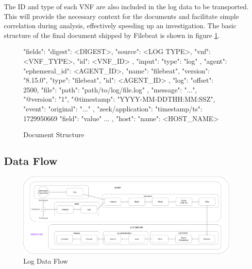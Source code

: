 \documentclass[final,1p,times,authoryear]{elsarticle}
\begin{document}
\vspace{1em}

The ID and type of each VNF are also included in the log data to be transported. This will provide the necessary context for the documents and facilitate simple correlation during analysis, effectively speeding up an investigation. The basic structure of the final document shipped by Filebeat is shown in figure \ref{fig:document-structure}.
\begin{figure}[H]
    \centering
\begin{smalljson}
{
    "fields": {
      "digest": <DIGEST>, %
      "source": <LOG TYPE>, %
      "vnf": <VNF_TYPE>, %
      "id": <VNF_ID> %
    },
    "input": {
      "type": "log" %
    },
    "agent": {
      "ephemeral_id": <AGENT_ID>, %
      "name": "filebeat", %
      "version": "8.15.0", %
      "type": "filebeat", %
      "id": <AGENT_ID> %
    },
    "log": {
      "offset": 2500, %
      "file": {
        "path": "path/to/log/file.log" %
      }
    },
    "message": "{...}", %
    "@version": "1", %
    "@timestamp": "YYYY-MM-DDTHH:MM:SSZ", %
    "event": {
      "original": "{...}" %
    },
    "zeek/application": {
      "timestamp/ts": 1729950669 %
      "field": "value" %
       ...
    },
    "host": {
      "name": <HOST_NAME> %
    }
}
\end{smalljson}
\caption{Document Structure}
\label{fig:document-structure}
\end{figure}

\subsection{Data Flow}
\label{sub3sec3}

\begin{figure}[H]
  \centering
  \includegraphics[width=\textwidth, height=\textheight, keepaspectratio]{diagrams/Flow.png}
  \caption{Log Data Flow}
  \label{fig:data-flow}
\end{figure}
\end{document}

